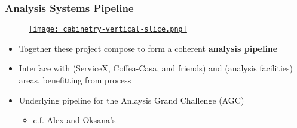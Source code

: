 \begin{frame}
  \frametitle{Analysis Systems Pipeline}

  \begin{figure}
    \begin{center}
      \href{https://iris-hep.org/as.html}{\texttt{[image: cabinetry-vertical-slice.png]}}
    \end{center}
  \end{figure}

  \begin{itemize}
    \item Together these project compose to form a coherent \textbf{analysis pipeline}
    \item Interface with  (ServiceX, Coffea-Casa, and friends) and  (analysis facilities) areas, benefitting from  process
    \item Underlying pipeline for the Anlaysis Grand Challenge (AGC)
    \begin{itemize}
      \item c.f. Alex and Oksana's 
    \end{itemize}
  \end{itemize}

\end{frame}

